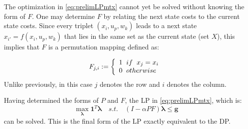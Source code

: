 \documentclass[conference]{IEEEtran}
\begin{document}



The optimization in \eqref{eq:prelimLPmtx} cannot yet be solved without knowing the form of $F$. One may determine $F$ by relating the next state costs to the current state costs. Since every triplet $(x_{i},u_{p},w_{k})$ leads to a next state $x_{i'}=f(x_{i},u_{p},w_{k})$ that lies in the same set as the current state (set $X$), this implies that $F$ is a permutation mapping defined as:

\begin{displaymath}
F_{j,i}:=
\left\{
\begin{array}{l}
1\hspace{0.2cm} if \hspace{0.2cm}x_{j}=x_{i}\\
0\hspace{0.2cm} otherwise
\end{array}
\right.
\end{displaymath} Unlike previously, in this case $j$ denotes the row and $i$ denotes the column.

Having determined the forms of $P$ and $F$, the LP in \eqref{eq:prelimLPmtx}, which is:
\begin{equation} \label{eq:LPfinal}
    \max_{\boldsymbol{\lambda}} \boldsymbol{1}^{T} \boldsymbol{\lambda}
    \hspace{1em}s.t.\hspace{1em}
    (I-\alpha PF)\boldsymbol{\lambda} \leq \boldsymbol{g}
\end{equation} can be solved. This is the final form of the LP exactly equivalent to the DP. 
\end{document}
